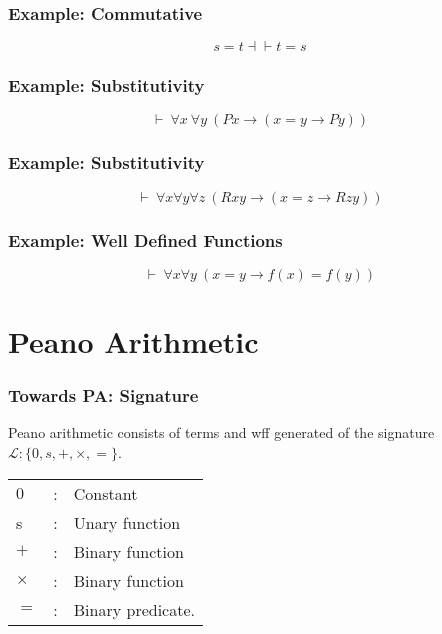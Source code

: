\documentclass{beamer}
\theoremstyle{indentDefn} \newtheorem{defn}[]{Definition}
\begin{document}
\begin{frame}
	\frametitle{Example: Commutative}

	$$ s = t \dashv \vdash t = s $$

	\vspace{6.5cm}
\end{frame}

\begin{frame}
	\frametitle{Example: Substitutivity}

	$$\vdash \ \forall x \ \forall y \ (Px \to (x = y \to Py))$$

	\vspace{6.5cm}

\end{frame}

\begin{frame}
	\frametitle{Example: Substitutivity}

	$$\vdash \ \forall x \forall y \forall z \ (Rxy \to (x = z \to Rzy))$$

	\vspace{6.5cm}

\end{frame}

\begin{frame}
	\frametitle{Example: Well Defined Functions}

	$$\vdash \ \forall x \forall y \ (x=y \to f(x)=f(y))$$

	\vspace{6.5cm}

\end{frame}

\section{Peano Arithmetic}

\begin{frame}
	\frametitle{Towards PA: Signature}

	Peano arithmetic consists of terms and wff generated of the signature $\mathcal{L} : \{0,s,+,\times,=\}$.

	\begin{center}
		\begin{tabular}{l c l}
			$0$ & : & Constant \\
			s & : & Unary function \\
			$+$ & : & Binary function \\
			$\times$ & : & Binary function \\
			$=$ & : & Binary predicate.
		\end{tabular}
	\end{center}

	\vspace{3cm}

\end{frame}
\end{document}
